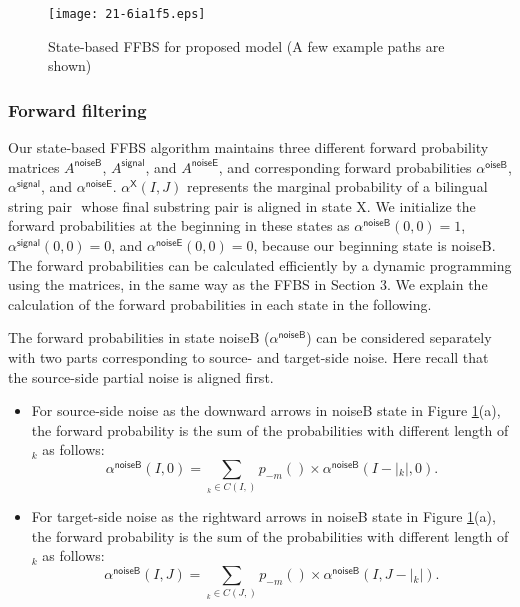 \documentclass[english]{jnlp_1.4}
\def\pair#1#2{}
\def\subpair#1#2{}
\newcommand{\svec}[1]{}
\begin{document}
\begin{figure}[t]
\begin{center}
\texttt{[image: 21-6ia1f5.eps]}
\end{center}
\caption{State-based FFBS for proposed model (A few example paths are shown)}
\label{fig:sffbs}
\end{figure}


\subsubsection{Forward filtering}

Our state-based FFBS algorithm maintains
three different forward probability matrices {$A^\mathsf{noiseB}$}, {$A^\mathsf{signal}$}, and {$A^\mathsf{noiseE}$},
and corresponding forward probabilities {$\alpha^\mathsf{oiseB}$}, {$\alpha^\mathsf{signal}$}, and {$\alpha^\mathsf{noiseE}$}.
{$\alpha^\mathsf{X} (I,J)$} represents the marginal probability of a bilingual string pair
{$\pair{s_1\ldots s_I}{t_1\ldots t_J}$} whose final substring pair is aligned in state {\sf X}.
We initialize the forward probabilities at the beginning  in these states as
{$\alpha^\mathsf{noiseB}(0,0) = 1$}, {$\alpha^\mathsf{signal}(0,0) = 0$}, and {$\alpha^\mathsf{noiseE}(0,0) = 0$},
because our beginning state is {\sf noiseB}.
The forward probabilities can be calculated efficiently by a dynamic programming using the matrices,
in the same way as the FFBS in Section 3.
We explain the calculation of the forward probabilities in each state in the following.

The forward probabilities in state {\sf noiseB} ({$\alpha^\mathsf{noiseB}$}) can be considered separately with two parts
corresponding to source- and target-side noise.
Here recall that the source-side partial noise is aligned first.
\begin{itemize}
\item For source-side noise as the downward arrows in {\sf noiseB} state in Figure {\ref{fig:sffbs}}(a), the forward probability is the sum of the probabilities with different length of {$\svec{\sigma}_{k}$} as follows:
\begin{equation}
\alpha^\mathsf{noiseB} (I, 0) =
 \sum_{\svec{\sigma}_{k} \in C(I,\svec{s})} p_{-m} (\subpair{\svec{\sigma}_{k}}{\mathit{noise}}) \times \alpha^\mathsf{noiseB} (I - |\svec{\sigma}_{k}|, 0). 
\label{eqn:forward_noiseB1}
\end{equation}
\item For target-side noise as the rightward arrows in {\sf noiseB} state in Figure {\ref{fig:sffbs}}(a), the forward probability is the sum of the probabilities with different length of {$\svec{\tau}_{k}$} as follows:
\begin{equation}
 \alpha^\mathsf{noiseB} (I, J) =
  \sum_{\svec{\tau}_{k} \in C(J,\svec{t})} p_{-m} (\subpair{\mathit{noise}}{\svec{\tau}_{k}}) \times \alpha^\mathsf{noiseB} (I, J - |\svec{\tau}_{k}|). 
\label{eqn:forward_noiseB2}
\end{equation}
\end{itemize}
\end{document}
